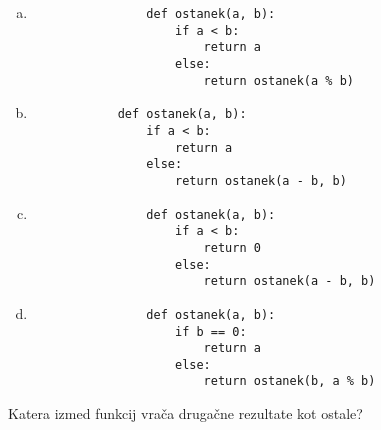 \documentclass[arhiv, 10pt]{../izpit}
\begin{document}
        \begin{multicols}{2}
        \begin{enumerate}[(a)]
\item 
                \begin{verbatim}
                def ostanek(a, b):
                    if a < b:
                        return a
                    else:
                        return ostanek(a % b)
                \end{verbatim}
            
\item 
            \begin{verbatim}
            def ostanek(a, b):
                if a < b:
                    return a
                else:
                    return ostanek(a - b, b)
            \end{verbatim}
        
\item 
                \begin{verbatim}
                def ostanek(a, b):
                    if a < b:
                        return 0
                    else:
                        return ostanek(a - b, b)
                \end{verbatim}
            
\item 
                \begin{verbatim}
                def ostanek(a, b):
                    if b == 0:
                        return a
                    else:
                        return ostanek(b, a % b)
                \end{verbatim}
            
\end{enumerate}

        \end{multicols}
    
        \naloga*
        
        Katera izmed funkcij vrača drugačne rezultate kot ostale?
    
\end{document}
